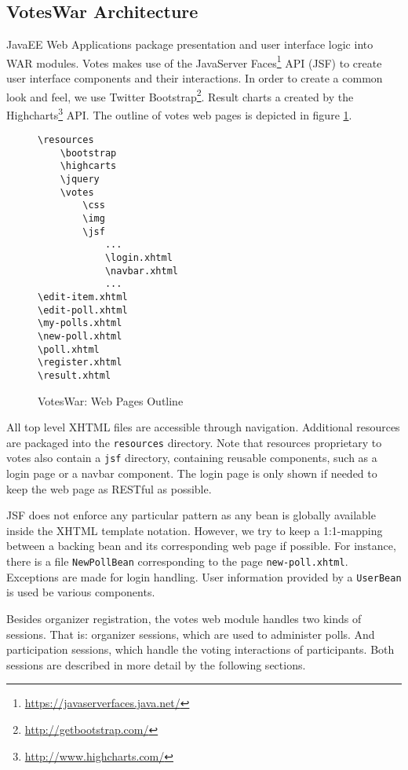 \subsection{VotesWar Architecture}
JavaEE Web Applications package presentation and user interface logic into WAR modules.
Votes makes use of the JavaServer Faces\footnote{\url{https://javaserverfaces.java.net/}} API (JSF) to create user interface components and their interactions.
In order to create a common look and feel, we use Twitter Bootstrap\footnote{\url{http://getbootstrap.com/}}.
Result charts a created by the Highcharts\footnote{\url{http://www.highcharts.com/}} API.
The outline of votes web pages is depicted in figure \ref{figure:web-directory-outline}.

\begin{figure}[h]
\centering
\begin{minipage}[t]{3cm}
\scriptsize
\begin{verbatim}
\resources
    \bootstrap
    \highcarts
    \jquery
    \votes
        \css
        \img
        \jsf
            ...
            \login.xhtml
            \navbar.xhtml
            ...
\edit-item.xhtml
\edit-poll.xhtml
\my-polls.xhtml
\new-poll.xhtml
\poll.xhtml
\register.xhtml
\result.xhtml
\end{verbatim}
\end{minipage}
\caption{VotesWar: Web Pages Outline}
\label{figure:web-directory-outline}
\end{figure}

All top level XHTML files are accessible through navigation.
Additional resources are packaged into the \texttt{resources} directory.
Note that resources proprietary to votes also contain a \texttt{jsf} directory, containing reusable components, such as a login page or a navbar component.
The login page is only shown if needed to keep the web page as RESTful as possible.

JSF does not enforce any particular pattern as any bean is globally available inside the XHTML template notation.
However, we try to keep a 1:1-mapping between a backing bean and its corresponding web page if possible.
For instance, there is a file \texttt{NewPollBean} corresponding to the page \texttt{new-poll.xhtml}.
Exceptions are made for login handling. 
User information provided by a \texttt{UserBean} is used be various components.

Besides organizer registration, the votes web module handles two kinds of sessions.
That is: organizer sessions, which are used to administer polls.
And participation sessions, which handle the voting interactions of participants.
Both sessions are described in more detail by the following sections.



